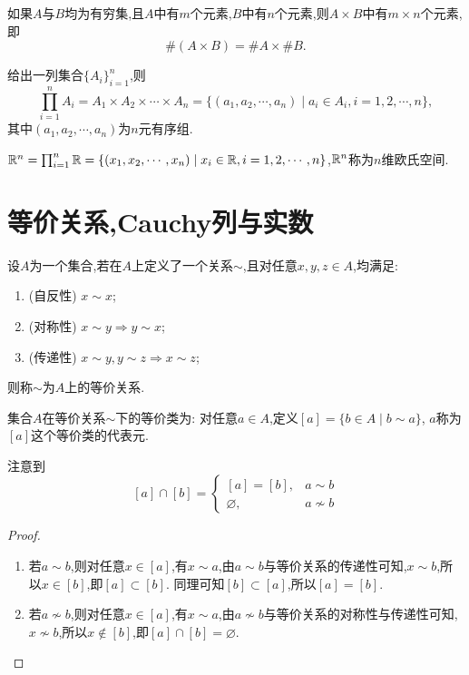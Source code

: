 如果$A$与$B$均为有穷集,且$A$中有$m$个元素,$B$中有$n$个元素,则$A \times B$中有$m \times n$个元素,即$$ \#(A \times B) = \# A \times \# B.$$

给出一列集合$\{ A_i \}_{i=1}^{n}$,则$$\prod_{i=1}^n A_i = A_1 \times A_2 \times \cdots \times A_n = \{ (a_1,a_2,\cdots,a_n) \mid a_i \in A_i, i=1,2,\cdots,n \},$$其中$(a_1,a_2,\cdots,a_n)$为$n$元有序组.

\begin{example}
    $\mathbb{R}^n = \prod_{i=1}^n \mathbb{R} = \{ (x_1,x_2,\cdots,x_n) \mid x_i \in \mathbb{R}, i=1,2,\cdots,n \}$,$\mathbb{R}^n$称为$n$维欧氏空间.
\end{example}

\section{等价关系,Cauchy列与实数}

\begin{definition}
    [等价关系]

    设$A$为一个集合,若在$A$上定义了一个关系$\sim$,且对任意$x,y,z \in A$,均满足:
    \begin{enumerate}[(1)]
        \item (自反性) $x \sim x$;
        \item (对称性) $x \sim y \Rightarrow y \sim x$;
        \item (传递性) $x \sim y, y \sim z \Rightarrow x \sim z$;
    \end{enumerate}
    则称$\sim$为$A$上的等价关系.
\end{definition}

\begin{definition}
    集合$A$在等价关系$\sim$下的等价类为: 对任意$a \in A$,定义$[a] = \{ b \in A \mid b \sim a \}$, $a$称为$[a]$这个等价类的代表元.
\end{definition}

注意到$$[a] \cap [b] = \begin{cases}
        [a] = [b],   & a \sim b     \\
        \varnothing, & a \not\sim b
    \end{cases}$$
\begin{proof}
    \begin{enumerate}[(1)]
        \item 若$a \sim b$,则对任意$x \in [a]$,有$x \sim a$,由$a \sim b$与等价关系的传递性可知,$x \sim b$,所以$x \in [b]$,即$[a] \subset [b]$. 同理可知$[b] \subset [a]$,所以$[a] = [b]$.
        \item 若$a \not\sim b$,则对任意$x \in [a]$,有$x \sim a$,由$a \not\sim b$与等价关系的对称性与传递性可知, $x \not\sim b$,所以$x \notin [b]$,即$[a] \cap [b] = \varnothing$.
    \end{enumerate}
\end{proof}

